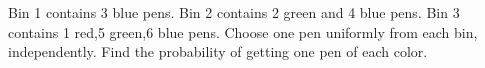 Bin 1 contains 3 blue pens. Bin 2 contains 2 green and 4 blue pens. Bin 3 contains 1 red,5 green,6 blue pens. Choose one pen uniformly from each bin, independently. Find the probability of getting one pen of each color.
